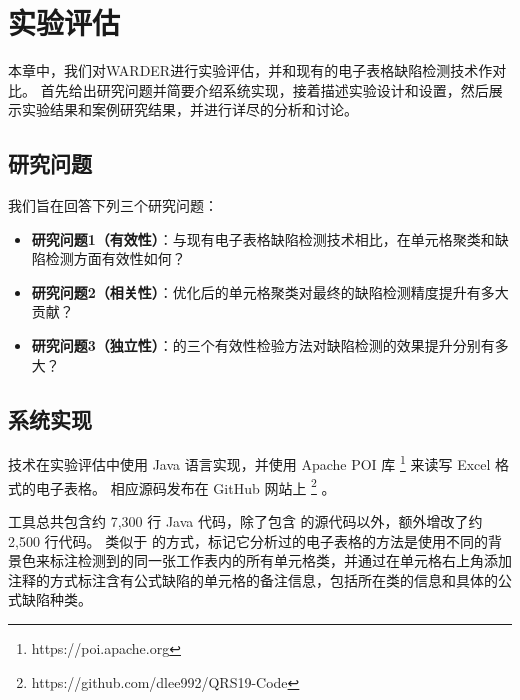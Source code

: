 \chapter{实验评估}

本章中，我们对WARDER进行实验评估，并和现有的电子表格缺陷检测技术作对比。
首先给出研究问题并简要介绍系统实现，接着描述实验设计和设置，然后展示实验结果和案例研究结果，并进行详尽的分析和讨论。


\section{研究问题}
我们旨在回答下列三个研究问题：
\begin{itemize}
    \item \textbf{研究问题1（有效性）}：与现有电子表格缺陷检测技术相比，\wa 在单元格聚类和缺陷检测方面有效性如何？
    \item \textbf{研究问题2（相关性）}：\wa 优化后的单元格聚类对最终的缺陷检测精度提升有多大贡献？
    \item \textbf{研究问题3（独立性）}：\wa 的三个有效性检验方法对缺陷检测的效果提升分别有多大？
\end{itemize}

\section{系统实现}
\wa 技术在实验评估中使用 Java 语言实现，并使用 Apache POI 库 \footnote{https://poi.apache.org} 来读写 Excel 格式的电子表格。
相应源码发布在 GitHub 网站上 \footnote{https://github.com/dlee992/QRS19-Code} 。

\wa 工具总共包含约 7,300 行 Java 代码，除了包含 \cu 的源代码以外，额外增改了约 2,500 行代码。
类似于 \cu 的方式，\wa 标记它分析过的电子表格的方法是使用不同的背景色来标注检测到的同一张工作表内的所有单元格类，并通过在单元格右上角添加注释的方式标注含有公式缺陷的单元格的备注信息，包括所在类的信息和具体的公式缺陷种类。





